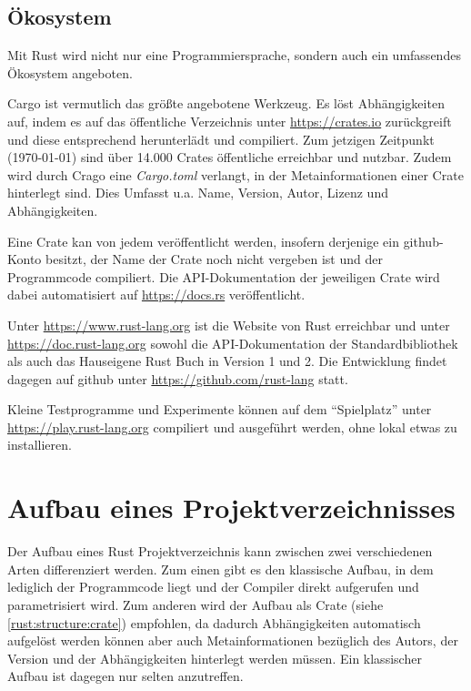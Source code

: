 \subsection{Ökosystem}

Mit Rust wird nicht nur eine Programmiersprache, sondern auch ein umfassendes Ökosystem angeboten.

Cargo ist vermutlich das größte angebotene Werkzeug.
Es löst Abhängigkeiten auf, indem es auf das öffentliche Verzeichnis unter \url{https://crates.io} zurückgreift und diese entsprechend herunterlädt und compiliert.
Zum jetzigen Zeitpunkt (\today) sind über 14.000 Crates öffentliche erreichbar und nutzbar.
Zudem wird durch Crago eine \textit{Cargo.toml} verlangt, in der Metainformationen einer Crate hinterlegt sind.
Dies Umfasst u.a. Name, Version, Autor, Lizenz und Abhängigkeiten.

Eine Crate kan von jedem veröffentlicht werden, insofern derjenige ein \gls{github}-Konto besitzt, der Name der Crate noch nicht vergeben ist und der Programmcode compiliert.
Die API-Dokumentation der jeweiligen Crate wird dabei automatisiert auf \url{https://docs.rs} veröffentlicht.

Unter \url{https://www.rust-lang.org} ist die Website von Rust erreichbar und unter \url{https://doc.rust-lang.org} sowohl die API-Dokumentation der Standardbibliothek als auch das Hauseigene Rust Buch in Version 1 und 2.
Die Entwicklung findet dagegen auf \gls{github} unter \url{https://github.com/rust-lang} statt.

Kleine Testprogramme und Experimente können auf dem \enquote{Spielplatz} unter \url{https://play.rust-lang.org} compiliert und ausgeführt werden, ohne lokal etwas zu installieren.


\section{Aufbau eines Projektverzeichnisses}

Der Aufbau eines Rust Projektverzeichnis kann zwischen zwei verschiedenen Arten differenziert werden.
Zum einen gibt es den klassische Aufbau, in dem lediglich der Programmcode liegt und der Compiler direkt aufgerufen und parametrisiert wird.
Zum anderen wird der Aufbau als Crate (siehe \autoref{rust:structure:crate}) empfohlen, da dadurch Abhängigkeiten automatisch aufgelöst werden können aber auch Metainformationen bezüglich des Autors, der Version und der Abhängigkeiten hinterlegt werden müssen.
Ein klassischer Aufbau ist dagegen nur selten anzutreffen.


